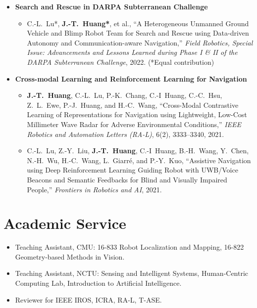 \documentclass[11pt]{article}
\newcommand{\me}[1]{\textbf{#1}}
\begin{document}
\begin{itemize}[itemsep=4pt]
  \item \textbf{Search and Rescue in DARPA Subterranean Challenge}
  \begin{itemize}
    \item C.-L.~Lu*, \me{J.-T.~Huang*}, et al.,
      ``A Heterogeneous Unmanned Ground Vehicle and Blimp Robot Team for Search and Rescue
      using Data-driven Autonomy and Communication-aware Navigation,''
      \textit{Field Robotics, Special Issue: Advancements and Lessons Learned during Phase I \& II
      of the DARPA Subterranean Challenge}, 2022. (*Equal contribution)
  \end{itemize}

  \item \textbf{Cross-modal Learning and Reinforcement Learning for Navigation}
  \begin{itemize}[itemsep=3pt]
    \item \me{J.-T.~Huang}, C.-L.~Lu, P.-K.~Chang, C.-I~Huang, C.-C.~Hsu, Z.~L.~Ewe, P.-J.~Huang,
      and H.-C.~Wang,
      ``Cross-Modal Contrastive Learning of Representations for Navigation using Lightweight,
      Low-Cost Millimeter Wave Radar for Adverse Environmental Conditions,''
      \textit{IEEE Robotics and Automation Letters (RA-L)}, 6(2), 3333--3340, 2021.
    \item C.-L.~Lu, Z.-Y.~Liu, \me{J.-T.~Huang}, C.-I~Huang, B.-H.~Wang, Y.~Chen, N.-H.~Wu,
      H.-C.~Wang, L.~Giarr\'e, and P.-Y.~Kuo,
      ``Assistive Navigation using Deep Reinforcement Learning Guiding Robot with UWB/Voice
      Beacons and Semantic Feedbacks for Blind and Visually Impaired People,''
      \textit{Frontiers in Robotics and AI}, 2021.
  \end{itemize}
\end{itemize}

\section{Academic Service}
\begin{itemize}
  \item Teaching Assistant, CMU: 16-833 Robot Localization and Mapping, 16-822 Geometry-based Methods in Vision.
  \item Teaching Assistant, NCTU: Sensing and Intelligent Systems, Human-Centric Computing Lab,
    Introduction to Artificial Intelligence.
  \item Reviewer for IEEE IROS, ICRA, RA-L, T-ASE.
\end{itemize}
\end{document}
